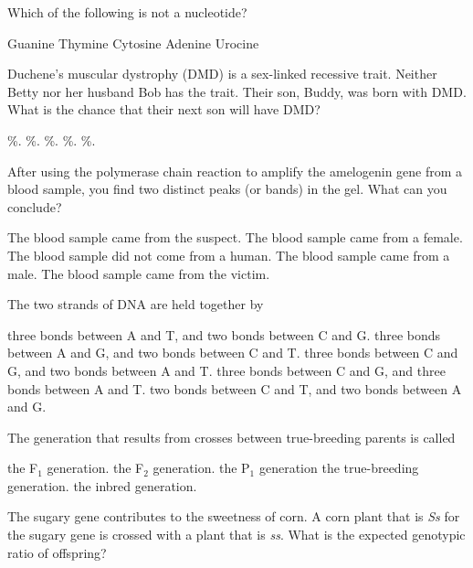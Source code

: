 \question
Which of the following is not a nucleotide?

\begin{choices}
\choice Guanine
\choice Thymine
\choice Cytosine
\choice Adenine
\correctchoice Urocine
\end{choices}

\question
Duchene's muscular dystrophy (DMD) is a sex-linked recessive trait. Neither Betty nor her husband Bob has the trait. Their son, Buddy, was born with DMD. What is the chance that their next son will have DMD?

\begin{choices}
\%.
\%.
\%.
\%.
\%.
\end{choices}

\question
After using the polymerase chain reaction to amplify the amelogenin gene from a blood sample, you find two distinct peaks (or bands) in the gel.  What can you conclude?

\begin{choices}
\choice The blood sample came from the suspect.
\choice The blood sample came from a female.
\choice The blood sample did not come from a human.
\correctchoice The blood sample came from a male.
\choice The blood sample came from the victim.
\end{choices}

\question
The two strands of DNA are held together by

\begin{choices}
\choice three bonds between A and T, and two bonds between C and G.
\choice three bonds between A and G, and two bonds between C and T.
\correctchoice three bonds between C and G, and two bonds between A and T.
\choice three bonds between C and G, and three bonds between A and T.
\choice two bonds between C and T, and two bonds between A and G.
\end{choices}

\question
The generation that results from crosses between true-breeding parents is called

\begin{choices}
\correctchoice the F$_1$ generation.
\choice the F$_2$ generation.
\choice the P$_1$ generation
\choice the true-breeding generation.
\choice the inbred generation.
\end{choices}

\question
The sugary gene contributes to the sweetness of corn. A corn plant that is \textit{Ss} for the sugary gene is crossed with a plant that is \textit{ss}. What is the expected genotypic ratio of offspring?

